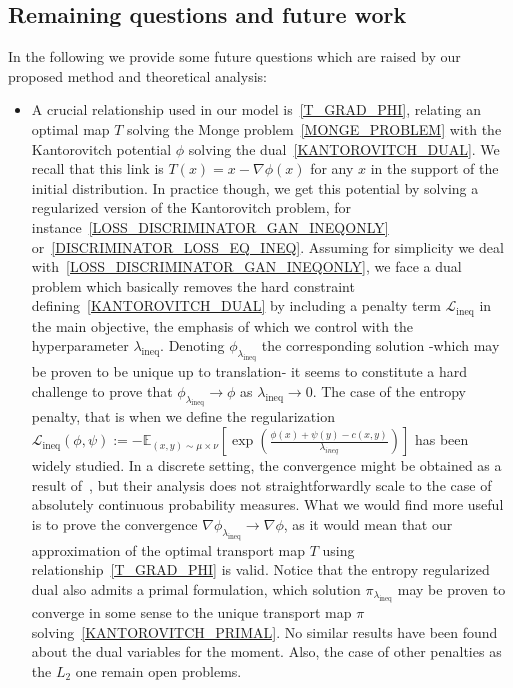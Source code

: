 \documentclass[runningheads]{llncs}
\newcommand\mycitet[1]{\cite{#1}}
\begin{document}
\subsection{Remaining questions and future work}
\label{open_questions}
In the following we provide some future questions which are raised by our proposed method and theoretical analysis: 
\begin{itemize}
    \item A crucial relationship used in our model is~\eqref{T_GRAD_PHI}, relating an optimal map $T$ solving the Monge problem~\eqref{MONGE_PROBLEM} with the Kantorovitch potential $\phi$ solving the dual~\eqref{KANTOROVITCH_DUAL}. We recall that this link is $T(x)=x-\nabla \phi(x)$ for any $x$ in the support of the initial distribution. In practice though, we get this potential by solving a regularized version of the Kantorovitch problem, for instance~\eqref{LOSS_DISCRIMINATOR_GAN_INEQONLY} or~\eqref{DISCRIMINATOR_LOSS_EQ_INEQ}. Assuming for simplicity we deal with~\eqref{LOSS_DISCRIMINATOR_GAN_INEQONLY}, we face a dual problem which basically removes the hard constraint defining~\eqref{KANTOROVITCH_DUAL} by including a penalty term $\mathcal{L}_{\text{ineq}}$ in the main objective, the emphasis of which we control with the hyperparameter $\lambda_{\text{ineq}}$. Denoting $\phi_{\lambda_{\text{ineq}}}$ the corresponding solution -which may be proven to be unique up to translation- it seems to constitute a hard challenge to prove that $\phi_{\lambda_{\text{ineq}}} \rightarrow \phi$ as $\lambda_{\text{ineq}} \rightarrow 0$. The case of the entropy penalty, that is when we define the regularization $\mathcal{L}_{\text{ineq}}(\phi,\psi):=- \mathds{E}_{(x,y) \sim \mu \times \nu} [\exp(\frac{\phi(x)+\psi(y)-c(x,y)}{\lambda_{ineq}})]$ has been widely studied. In a discrete setting, the convergence might be obtained as a result of~\mycitet{Cominetti1994}, but their analysis does not straightforwardly scale to the case of absolutely continuous probability measures. What we would find more useful is to prove the convergence $\nabla \phi_{\lambda_{\text{ineq}}} \rightarrow \nabla \phi$, as it would mean that our approximation of the optimal transport map $T$ using relationship~\eqref{T_GRAD_PHI} is valid. Notice that the entropy regularized dual also admits a primal formulation, which solution $\pi_{\lambda_{\text{ineq}}}$ may be proven to converge in some sense to the unique transport map $\pi$ solving~\eqref{KANTOROVITCH_PRIMAL}. No similar results have been found about the dual variables for the moment. Also, the case of other penalties as the $L_2$ one remain open problems. 

\end{itemize}
\end{document}
